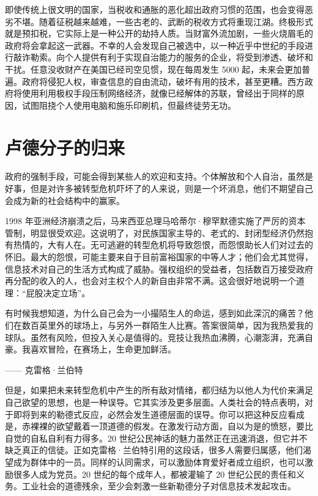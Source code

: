即使传统上很文明的国家，当税收和通胀的恶化超出政府习惯的范围，也会变得恶劣不堪。随着征税越来越难，一些古老的、武断的税收方式将重现江湖。终极形式就是预扣税，它实际上是一种公开的劫持人质。当财富外流加剧，一些火烧眉毛的政府将会拿起这一武器。不幸的人会发现自己被选中，以一种近乎中世纪的手段进行敲诈勒索。向个人提供有利于实现自治能力的服务的企业，将受到渗透、破坏和干扰。任意没收财产在美国已经司空见惯，现在每周发生 5000 起，未来会更加普遍。政府将侵犯人权，审查信息的自由流动，破坏有用的技术，甚至更糟。西方政府将使用利用极权手段压制网络经济，就像已经解体的苏联，曾经出于同样的原因，试图阻挠个人使用电脑和施乐印刷机，但最终徒劳无功。



\section{卢德分子的归来}
政府的强制手段，可能会得到某些人的欢迎和支持。个体解放和个人自治，虽然是好事，但是对许多被转型危机吓坏了的人来说，则是一个坏消息，他们不期望自己会成为新的社会结构中的赢家。


1998 年亚洲经济崩溃之后，马来西亚总理马哈蒂尔·穆罕默德实施了严厉的资本管制，明显很受欢迎。这说明了，对民族国家主导的、老式的、封闭型经济仍然抱有热情的，大有人在。无可逃避的转型危机将导致怨恨，而怨恨助长人们对过去的怀旧。最大的怨恨，可能主要来自于目前富裕国家的中等人才；他们会尤其觉得，信息技术对自己的生活方式构成了威胁。强权组织的受益者，包括数百万接受政府再分配的收入的人，也会对主权个人的新自由非常不满。这会很好地说明一个道理：“屁股决定立场”。


\begin{tcolorbox}
有时候我想知道，为什么自己会为一小撮陌生人的命运，感到如此深沉的痛苦？他们在数百英里外的球场上，与另外一群陌生人比赛。答案很简单，因为我热爱我的球队。虽然有风险，但投入关心是值得的。竞技让我热血沸腾，心潮澎湃，充满自豪。我喜欢冒险，在赛场上，生命更加鲜活。
\begin{flushright}
—— 克雷格·兰伯特
\end{flushright}
\end{tcolorbox}

但是，如果把未来转型危机中产生的所有敌对情绪，都归结为以他人为代价来满足自己欲望的思想，也是一种误导。它其实涉及更多层面。人类社会的特点表明，对于即将到来的勒德式反应，必然会发生道德层面的误导。你可以把这种反应看成是，赤裸裸的欲望戴着一顶道德的假发。在激发行动方面，自以为是的愤怒，要比自觉的自私自利有力得多。20 世纪公民神话的魅力虽然正在迅速消退，但它并不缺乏真正的信徒。正如克雷格·兰伯特引用的这段话，很多人需要归属感，他们渴望成为群体中的一员。同样的认同需求，可以激励体育爱好者成立组织，也可以激励很多人成为党员。20 世纪的每个成年人，都被灌输了 20 世纪公民的责任和义务。工业社会的道德残余，至少会刺激一些新勒德分子对信息技术发起攻击。


